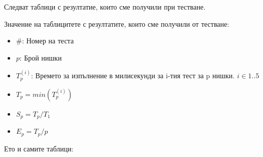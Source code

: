 \documentclass[12pt]{article}
\begin{document}
\bigbreak

Следват таблици с резултатие, които сме получили при тестване.

\bigbreak
Значение на таблицитете с резултатите, които сме получили от тестване:
\begin{itemize}
	\item \#: Номер на теста
	\item $p$: Брой нишки
	\item $T^{(i)}_p$: Времето за изпълнение в милисекунди за i-тия тест за p нишки. $i \in 1..5$
	\item $T_p = min(T^{(i)}_p)$
	\item $S_p = T_p / T_1$
	\item $E_p = T_p / p$
\end{itemize}
\bigbreak


Ето и самите таблици:
\bigbreak
\end{document}
